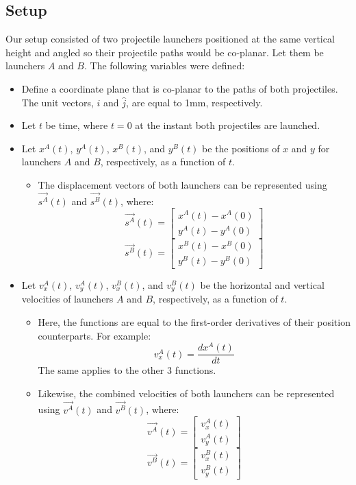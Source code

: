 \documentclass[12pt]{article}
\begin{document}
\subsection{Setup}

Our setup consisted of two projectile launchers positioned at the same vertical height and angled so their projectile paths would be co-planar. Let them be launchers $A$ and $B$.
The following variables were defined:
\begin{itemize}
    \item Define a coordinate plane that is co-planar to the paths of both projectiles. The unit vectors, $\hat{i}$ and $\hat{j}$, are equal to 1mm, respectively.
    \item Let $t$ be time, where $t=0$ at the instant both projectiles are launched.
    \item Let $x^A(t)$, $y^A(t)$, $x^B(t)$, and $y^B(t)$ be the positions of $x$ and $y$ for launchers $A$ and $B$, respectively, as a function of $t$.
    \begin{itemize}
        \item The displacement vectors of both launchers can be represented using $\Vec{s^A}(t)$ and $\Vec{s^B}(t)$, where:
        \[
        \Vec{s^A}(t)= \begin{bmatrix} x^A(t) - x^A(0) \\ y^A(t) - y^A(0)\end{bmatrix}
        \]
        \[
        \Vec{s^B}(t)= \begin{bmatrix} x^B(t) - x^B(0) \\ y^B(t) - y^B(0) \end{bmatrix}
        \]
    \end{itemize}
    \item Let $v_x^A(t)$, $v_y^A(t)$, $v_x^B(t)$, and $v_y^B(t)$ be the horizontal and vertical velocities of launchers $A$ and $B$, respectively, as a function of $t$. 
    \begin{itemize}
        \item Here, the functions are equal to the first-order derivatives of their position counterparts. For example: 
        \[
        v_x^A(t) = \frac{d x^A(t)}{dt}
        \]
        The same applies to the other 3 functions.
        \item Likewise, the combined velocities of both launchers can be represented using $\Vec{v^A}(t)$ and $\Vec{v^B}(t)$, where:
        \[
        \Vec{v^A}(t)= \begin{bmatrix} v_x^A(t) \\ v_y^A(t) \end{bmatrix}
        \]
        \[
        \Vec{v^B}(t)= \begin{bmatrix} v_x^B(t) \\ v_y^B(t) \end{bmatrix}
        \]
        
    \end{itemize}
    
\end{itemize}
\end{document}
